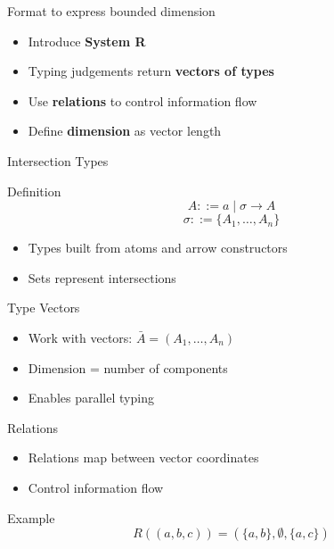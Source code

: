 \documentclass{beamer}
\renewcommand{\:}{\mbox{\,:\,}\xspace}
\begin{document}
\begin{frame}{Format to express bounded dimension}
  \begin{itemize}
  \item Introduce \textbf{System R}
  \item Typing judgements return \textbf{vectors of types}
  \item Use \textbf{relations} to control information flow
  \item Define \textbf{dimension} as vector length
  \end{itemize}
\end{frame}



\begin{frame}{Intersection Types}
\begin{block}{Definition}
\[
A ::= a \mid \sigma \rightarrow A
\]
\[
\sigma ::= \{A_1, \dots, A_n\}
\]
\end{block}

\begin{itemize}
    \item Types built from atoms and arrow constructors
    \item Sets represent intersections
\end{itemize}
\end{frame}


\begin{frame}{Type Vectors}
\begin{itemize}
    \item Work with vectors: $\bar{A} = (A_1, \dots, A_n)$
    \item Dimension = number of components
    \item Enables parallel typing
\end{itemize}
\end{frame}


\begin{frame}{Relations}
\begin{itemize}
    \item Relations map between vector coordinates
    \item Control information flow
\end{itemize}

\begin{block}{Example}
\[
R((a,b,c)) = (\{a,b\}, \emptyset, \{a,c\})
\]
\end{block}
\end{frame}
\end{document}
